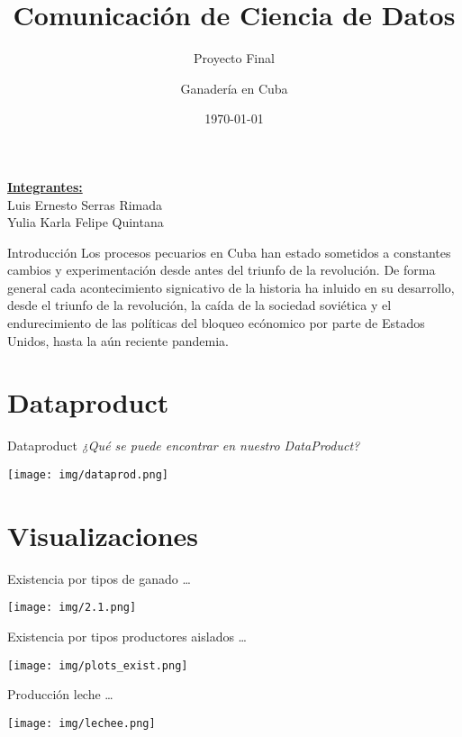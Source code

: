 \documentclass{beamer}
\title{Comunicación de Ciencia de Datos}
\subtitle{Proyecto Final}
\author{Ganadería en Cuba}
\date{\today}
\begin{document}
\begin{frame}
    \titlepage 
    \underline{\textbf{Integrantes: }}\\
    Luis Ernesto Serras Rimada \\ Yulia Karla Felipe Quintana
\end{frame}

\begin{frame}{Introducción}
    Los procesos pecuarios en Cuba han estado sometidos a constantes cambios y experimentación
desde antes del triunfo de la revolución. De forma general cada acontecimiento signicativo de
la historia ha inluido en su desarrollo, desde el triunfo de la revolución, la caída de la sociedad
soviética y el endurecimiento de las políticas del bloqueo ecónomico por parte de Estados Unidos,
hasta la aún reciente pandemia. 
\end{frame}



\section{Dataproduct}
\begin{frame}
\begin{block}{Dataproduct}
    \textit{¿Qué se puede encontrar en nuestro DataProduct?}
\end{block}
\texttt{[image: img/dataprod.png]}
\end{frame}

\section{Visualizaciones}
\begin{frame}
    \begin{block}{Existencia por tipos de ganado}
        \dots
    \end{block}
\texttt{[image: img/2.1.png]}
\end{frame}

\begin{frame}
\begin{block}{Existencia por tipos productores aislados}
    \dots
\end{block}
\texttt{[image: img/plots\_exist.png]}
\end{frame}\begin{frame}

\begin{block}{Producción leche}
    \dots
\end{block}
\texttt{[image: img/lechee.png]}
\end{frame}
\end{document}
